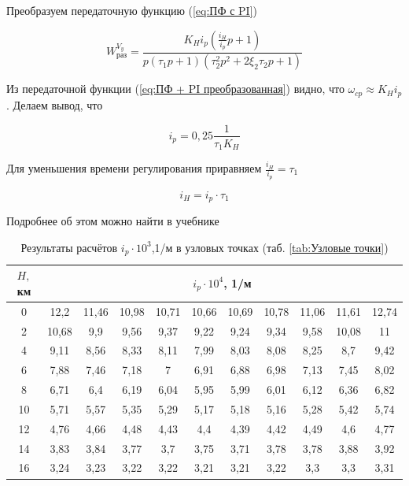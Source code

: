     Преобразуем передаточную функцию (\ref{eq:ПФ с PI})
    
    \begin{equation}
        \label{eq:ПФ + PI преобразованная}
        W_\text{раз}^{V_y} = \frac{K_H i_p (\frac{i_H}{i_p}p + 1)}{p(\tau_1p+1)(\tau_2^2p^2+2\xi_2\tau_2p+1)}
    \end{equation}
    
    Из передаточной функции (\ref{eq:ПФ + PI преобразованная}) видно, что $\omega_{cp} \approx K_H i_p$. Делаем вывод, что 
    
    \begin{equation}
    \label{eq:i_p}
        i_p = 0,25 \frac{1}{\tau_1 K_H}
    \end{equation}
    
    Для уменьшения времени регулирования приравняем $\frac{i_H}{i_p} = \tau_1$
    
    \begin{equation}
        \label{eq:i_H}
        i_H = i_p \cdot \tau_1
    \end{equation}
    
    Подробнее об этом можно найти в учебнике \cite{UDLA}
    
        \begin{table}[H]    
    \centering
    \caption{Результаты расчётов $i_p \cdot 10^{3}$,1/м в узловых точках (таб. \ref{tab:Узловые точки})}
    \label{tab:Результаты расчётов $q(H,M),$Н/м$^2$}
    \begin{tabular}{|c|c|c|c|c|c|c|c|c|c|c|}
    \hline
        $H,$ км &\multicolumn{10}{|c|}{$i_p \cdot 10^{4}$, 1/м } \\ \hline
         0 & 12,2 & 11,46 & 10,98 & 10,71 & 10,66 & 10,69 & 10,78 & 11,06 & 11,61 & 12,74  \\ \hline
        2 & 10,68 & 9,9 & 9,56 & 9,37 & 9,22 & 9,24 & 9,34 & 9,58 & 10,08 & 11  \\ \hline
        4 & 9,11 & 8,56 & 8,33 & 8,11 & 7,99 & 8,03 & 8,08 & 8,25 & 8,7 & 9,42  \\ \hline
        6 & 7,88 & 7,46 & 7,18 & 7 & 6,91 & 6,88 & 6,98 & 7,13 & 7,45 & 8,02  \\ \hline
        8 & 6,71 & 6,4 & 6,19 & 6,04 & 5,95 & 5,99 & 6,01 & 6,12 & 6,36 & 6,82  \\ \hline
        10 & 5,71 & 5,57 & 5,35 & 5,29 & 5,17 & 5,18 & 5,16 & 5,28 & 5,42 & 5,74  \\ \hline
        12 & 4,76 & 4,66 & 4,48 & 4,43 & 4,4 & 4,39 & 4,42 & 4,49 & 4,6 & 4,77  \\ \hline
        14 & 3,83 & 3,84 & 3,77 & 3,7 & 3,75 & 3,71 & 3,78 & 3,78 & 3,88 & 3,92  \\ \hline
        16 & 3,24 & 3,23 & 3,22 & 3,22 & 3,21 & 3,21 & 3,22 & 3,3 & 3,3 & 3,31  \\ \hline
    \end{tabular}
\end{table}
    
